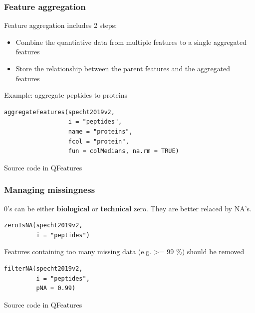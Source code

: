 \documentclass{beamer}
\newcommand{\hcode}[2][lgray]{{\ttfamily\color{vdgray}\colorbox{#1}{#2}}}
\newcommand{\frametitlesection}[1]{\frametitle{\centering #1 \footnotesize \hspace{0pt plus 1 filll} \insertsection}}
\begin{document}
\begin{frame}[fragile]
    \frametitlesection{Feature aggregation}
    Feature aggregation includes 2 steps:
    \begin{itemize}
        \item{Combine the quantiative data from multiple features to a single 
        aggregated features}
        \item{Store the relationship between the parent features and the 
        aggregated features}
    \end{itemize}
    
    Example: aggregate peptides to proteins
    
    \begin{lstlisting}
aggregateFeatures(specht2019v2,
                  i = "peptides",
                  name = "proteins", 
                  fcol = "protein", 
                  fun = colMedians, na.rm = TRUE)
    \end{lstlisting}
    
    Source code in \hcode{QFeatures}
    
\end{frame}


\begin{frame}[fragile]
    \frametitlesection{Managing missingness}
    
    \hcode{0}'s can be either \textbf{biological} or \textbf{technical} zero. 
    They are better relaced by \hcode{NA}'s.
    
    \begin{lstlisting}
zeroIsNA(specht2019v2,
         i = "peptides")
    \end{lstlisting}
    
    Features containing too many missing data (e.g. >= 99 \%) should be removed
    
    \begin{lstlisting}
filterNA(specht2019v2, 
         i = "peptides", 
         pNA = 0.99)
    \end{lstlisting}
    
    Source code in \hcode{QFeatures}
    
\end{frame}
\end{document}
